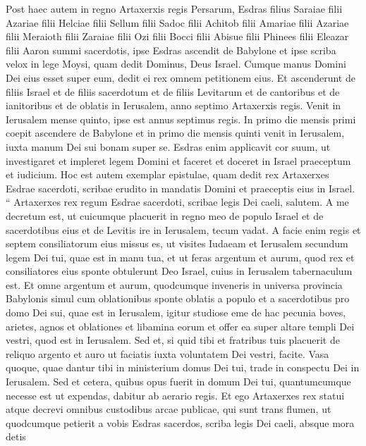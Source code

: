 \begin{biblechapter}
\begin{biblechapter}
\begin{biblechapter}
\begin{biblechapter}
\begin{biblechapter}
\begin{biblechapter}
\begin{biblechapter}
\verse Post haec autem in regno Artaxerxis regis Persarum, Esdras filius Saraiae filii Azariae filii Helciae 
\verse filii Sellum filii Sadoc filii Achitob 
\verse filii Amariae filii Azariae filii Meraioth 
\verse filii Zaraiae filii Ozi filii Bocci 
\verse filii Abisue filii Phinees filii Eleazar filii Aaron summi sacerdotis, 
 \verse ipse Esdras ascendit de Babylone et ipse scriba velox in lege Moysi, quam dedit Dominus, Deus Israel. Cumque manus Domini Dei eius esset super eum, dedit ei rex omnem petitionem eius. 
\verse Et ascenderunt de filiis Israel et de filiis sacerdotum et de filiis Levitarum et de cantoribus et de ianitoribus et de oblatis in Ierusalem, anno septimo Artaxerxis regis. 
\verse Venit in Ierusalem mense quinto, ipse est annus septimus regis.
 \verse In primo die mensis primi coepit ascendere de Babylone et in primo die mensis quinti venit in Ierusalem, iuxta manum Dei sui bonam super se. 
\verse Esdras enim applicavit cor suum, ut investigaret et impleret legem Domini et faceret et doceret in Israel praeceptum et iudicium.
 \verse Hoc est autem exemplar epistulae, quam dedit rex Artaxerxes Esdrae sacerdoti, scribae erudito in mandatis Domini et praeceptis eius in Israel.
 \verse “ Artaxerxes rex regum Esdrae sacerdoti, scribae legis Dei caeli, salutem. 
\verse A me decretum est, ut cuicumque placuerit in regno meo de populo Israel et de sacerdotibus eius et de Levitis ire in Ierusalem, tecum vadat. 
\verse A facie enim regis et septem consiliatorum eius missus es, ut visites Iudaeam et Ierusalem secundum legem Dei tui, quae est in manu tua, 
\verse et ut feras argentum et aurum, quod rex et consiliatores eius sponte obtulerunt Deo Israel, cuius in Ierusalem tabernaculum est. 
\verse Et omne argentum et aurum, quodcumque inveneris in universa provincia Babylonis simul cum oblationibus sponte oblatis a populo et a sacerdotibus pro domo Dei sui, quae est in Ierusalem, 
\verse igitur studiose eme de hac pecunia boves, arietes, agnos et oblationes et libamina eorum et offer ea super altare templi Dei vestri, quod est in Ierusalem. 
\verse Sed et, si quid tibi et fratribus tuis placuerit de reliquo argento et auro ut faciatis iuxta voluntatem Dei vestri, facite.
 \verse Vasa quoque, quae dantur tibi in ministerium domus Dei tui, trade in conspectu Dei in Ierusalem. 
\verse Sed et cetera, quibus opus fuerit in domum Dei tui, quantumcumque necesse est ut expendas, dabitur ab aerario regis. 
\verse Et ego Artaxerxes rex statui atque decrevi omnibus custodibus arcae publicae, qui sunt trans flumen, ut quodcumque petierit a vobis Esdras sacerdos, scriba legis Dei caeli, absque mora detis 

\end{biblechapter}
\end{biblechapter}
\end{biblechapter}
\end{biblechapter}
\end{biblechapter}
\end{biblechapter}
\end{biblechapter}

